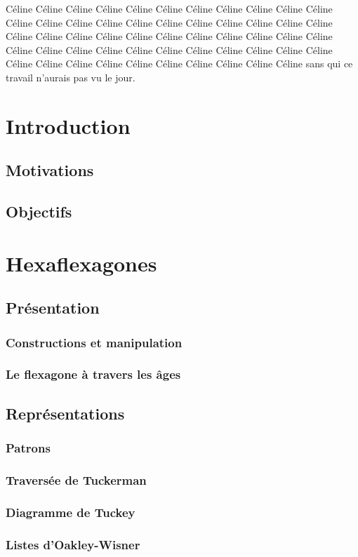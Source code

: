 \documentclass[10pt,a4paper]{article}
\begin{document}
Céline Céline Céline Céline Céline Céline Céline Céline Céline Céline Céline Céline Céline Céline Céline Céline Céline Céline Céline Céline Céline Céline Céline Céline Céline Céline Céline Céline Céline Céline Céline Céline Céline Céline Céline Céline Céline Céline Céline Céline Céline Céline Céline Céline Céline Céline Céline Céline Céline Céline Céline Céline Céline Céline sans qui ce travail n'aurais pas vu le jour.
\section{Introduction}
	\subsection{Motivations}
	\subsection{Objectifs}

\section{Hexaflexagones}
	\subsection{Présentation}
		\subsubsection{Constructions et manipulation}
		\subsubsection{Le flexagone à travers les âges}
	\subsection{Représentations}
		\subsubsection{Patrons}
		\subsubsection{Traversée de Tuckerman}
		\subsubsection{Diagramme de Tuckey}
		\subsubsection{Listes d'Oakley-Wisner}
\end{document}
